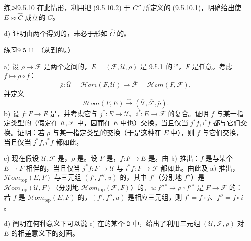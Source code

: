 \begin{SGAresult}{练习}{9.5.10}
在此情形，利用把 (9.5.10.2) 于 $C''$ 所定义的 (9.5.10.1)，明确给出使 $E\approx\widehat C$ 成立的 $C$。

d) 证明由两个得到的，未必于形如 $\widehat C$ 的。
\end{SGAresult}
\begin{SGAresult}{练习}{9.5.11}
（从到的。）

a) 设 $\rho\to\mathscr F$ 是两个之间的，$E=(\mathscr F,\mathscr U,\rho)$ 是 9.5.1 的“”，$F$ 是任意。考虑 $f\mapsto\rho\circ f$：
\[
\overline\rho:\overline{\mathscr U}=\mathscr{H}om(F,\mathscr U)\longrightarrow\overline{\mathscr F}=\mathscr{H}om(F,\mathscr F),
\]
并定义
\[
\mathscr{H}om(F,E)\xrightarrow{\sim}(\overline{\mathscr U},\overline{\mathscr F},\overline\rho).
\]
b) 设 $f:F\to E$ 是，并考虑它与 $j^*:E\to\mathscr U$、$i^*:E\to\mathscr F$ 的复合。证明 $f$ 与某一指定类型的（假定在 $\mathscr U,\mathscr F$ 中，因而在 $E$ 中也）交换，当且仅当 $j^*f,i^*f$ 都与它们交换。证明：若 $\rho$ 与某一指定类型的交换（于是这种在 $E$ 中），则 $f$ 与它们交换，当且仅当 $j^*f,i^*f$ 都如此。

c) 现在假设 $\mathscr U,\mathscr F$ 是，$\rho$ 是。设 $F$ 是，$f:F\to E$ 是。由 b) 推出：$f$ 是与某个 $E\to F$ 相伴的，当且仅当 $j^*f:F\to\mathscr U$ 与 $i^*f:F\to\mathscr F$ 都如此。由此及 a) 推出， $\mathscr{H}om_{\mathrm{top}}(E,F)$ 与三元组 $(f',f'',u)$ 的，其中 $f'$（分别地 $f''$）是 $\mathscr{H}om_{\mathrm{top}}(\mathscr U,F)$（分别地 $\mathscr{H}om_{\mathrm{top}}(\mathscr F,F)$）的，$u:f''{}^*\to\rho\circ f'{}^*$ 是 $F\to\mathscr F$ 的：若 $f$ 是 $\mathscr{H}om_{\mathrm{top}}(E,F)$ 的，$(f',f'',u)$ 是相应三元组，则 $f'=f\circ j$、$f''=f\circ i$。

d) 阐明在何种意义下可以说 c) 在的某个 2-中，给出了利用三元组 $(\mathscr U,\mathscr F,\rho)$ 对 $E$ 的相差意义下的刻画。
\end{SGAresult}
